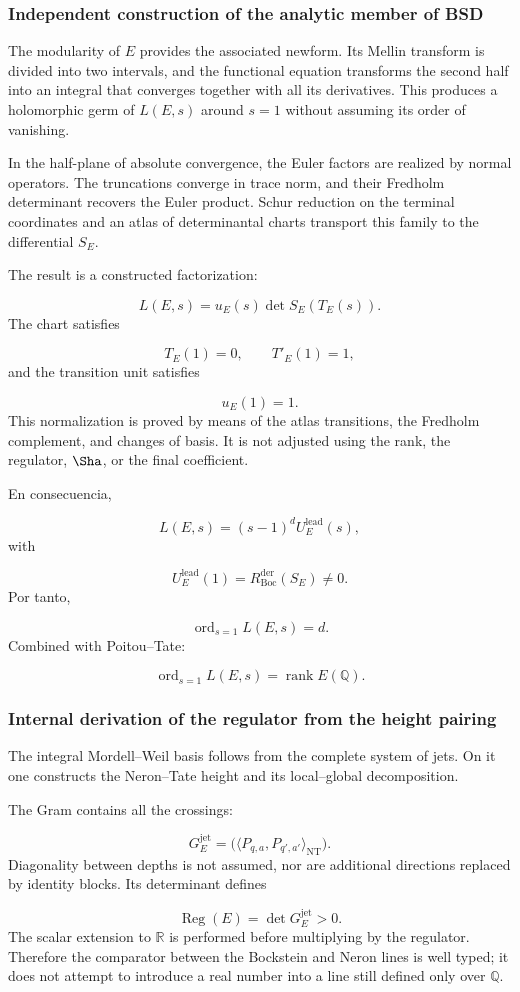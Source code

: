 \subsubsection{Independent construction of the analytic member of BSD}
The modularity of \(E\) provides the associated newform. Its Mellin transform is divided into two intervals, and the functional equation transforms the second half into an integral that converges together with all its derivatives. This produces a holomorphic germ of \(L(E,s)\) around \(s=1\) without assuming its order of vanishing.\par
In the half-plane of absolute convergence, the Euler factors are realized by normal operators. The truncations converge in trace norm, and their Fredholm determinant recovers the Euler product. Schur reduction on the terminal coordinates and an atlas of determinantal charts transport this family to the differential \(S_E\).\par
The result is a constructed factorization:\par
\[
L(E,s)
=
u_E(s)
\det S_E(T_E(s)).
\]
The chart satisfies\par
\[
T_E(1)=0,
\qquad
T'_E(1)=1,
\]
and the transition unit satisfies\par
\[
u_E(1)=1.
\]
This normalization is proved by means of the atlas transitions, the Fredholm complement, and changes of basis. It is not adjusted using the rank, the regulator, \(\Sha\), or the final coefficient.\par
En consecuencia,\par
\[
L(E,s)
=
(s-1)^dU_E^{\mathrm{lead}}(s),
\]
with\par
\[
U_E^{\mathrm{lead}}(1)
=
R_{\mathrm{Boc}}^{\mathrm{der}}(S_E)
\neq0.
\]
Por tanto,\par
\[
\operatorname{ord}_{s=1}L(E,s)=d.
\]
Combined with Poitou–Tate:\par
\[
\operatorname{ord}_{s=1}L(E,s)
=
\operatorname{rank}E(\mathbb Q).
\]
\subsubsection{Internal derivation of the regulator from the height pairing}
The integral Mordell–Weil basis follows from the complete system of jets. On it one constructs the Neron–Tate height and its local–global decomposition.\par
The Gram contains all the crossings:\par
\[
G_E^{\mathrm{jet}}
=
\bigl(
\langle P_{q,a},P_{q',a'}\rangle_{\mathrm{NT}}
\bigr).
\]
Diagonality between depths is not assumed, nor are additional directions replaced by identity blocks. Its determinant defines\par
\[
\operatorname{Reg}(E)
=
\det G_E^{\mathrm{jet}}
>0.
\]
The scalar extension to \(\mathbb R\) is performed before multiplying by the regulator. Therefore the comparator between the Bockstein and Neron lines is well typed; it does not attempt to introduce a real number into a line still defined only over \(\mathbb Q\).\par
{}
